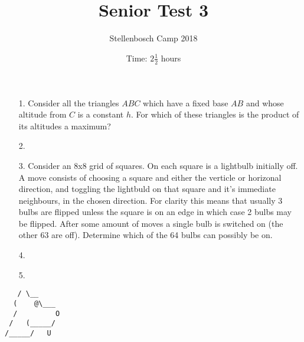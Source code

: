 \documentclass[a4paper, 12pt]{article}
\title{Senior Test 3}
\author{Stellenbosch Camp 2018}
\date{Time: $2 \frac{1}{2}$ hours}
\begin{document}
 \maketitle

\begin{enumerate}

\item[1.] Consider all the triangles $ABC$ which have a fixed base $AB$ and whose altitude from $C$ is a constant $h$. For which of these triangles is the product of its altitudes a maximum? 


% 
\item[2.]  



\item[3.]
Consider an 8x8 grid of squares. On each square is a lightbulb initially off. A move consists of choosing a square and either the verticle or horizonal direction, and toggling the lightbuld on that square and it's immediate neighbours, in the chosen direction. For clarity this means that usually 3 bulbs are flipped unless the square is on an edge in which case 2 bulbs may be flipped. After some amount of moves a single bulb is switched on (the other 63 are off). Determine which of the 64 bulbs can possibly be on. 


% 
\item[4.]


% 
\item[5.]


\end{enumerate}

\vfill

\centering
\begin{BVerbatim}
   / \__
  (    @\___
  /         O
 /   (_____/
/_____/   U
\end{BVerbatim}

\vspace{12mm}
\end{document}

